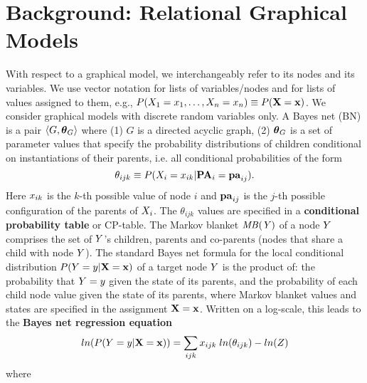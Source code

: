 \documentclass{article}
\begin{document}
\section{Background: Relational Graphical Models} 
With respect to a graphical model, we interchangeably refer to its nodes and its variables. 
We  use vector notation for lists of variables/nodes and for lists of values assigned to them, e.g., $P(X_{1} = x_{1},\ldots,X_{n} = x_{n}) \equiv P(\mathbf{X} = \mathbf{x})$.  
%
We consider graphical models with discrete random variables only. 
A Bayes net (BN) is a pair
$\langle{G,\boldsymbol{\theta}_G}\rangle$ where (1) $G$ is a directed acyclic graph, (2) $\boldsymbol{\theta}_G$ is a set of parameter values that specify the  probability distributions of children conditional on instantiations of their parents, 
i.e. all conditional probabilities of the form \[\theta_{ijk} \equiv P(X_{i}=x_{ik}|\mathbf{PA}_{i}=\mathbf{pa}_{ij}).\] Here $x_{ik}$ is the $k$-th possible value of node $i$ 
and $\mathbf{pa}_{ij}$ is the $j$-th possible configuration of the parents of $X_{i}$. The $\theta_{ijk}$ values are specified in a \textbf{conditional probability table} %
or CP-table. The Markov blanket $\it{MB}(Y)$ of a node $Y$ comprises the set of $Y$'s $\mbox{children}$, $\mbox{parents}$ and $\mbox{co-parents}$ (nodes that share a child with node $Y$). The standard Bayes net formula for the local conditional distribution $P(Y = y|\mathbf{X} = \mathbf{x})$ of a target node $Y$ 
 is the product of: the probability that $Y= y$ given the state of its parents, and the probability of each child node value given the state of its parents, where Markov blanket values and states are specified in the assignment $\mathbf{X} = \mathbf{x}$. Written on a log-scale, this leads to the \textbf{Bayes net regression equation} 
\begin{equation} \label{eq:bn-mb}
ln(P(Y = y|\mathbf{X}=\mathbf{x})) = \sum_{ijk} x_{ijk}\; ln(\theta_{ijk}) - ln(Z)
\end{equation}
where %
\end{document}
